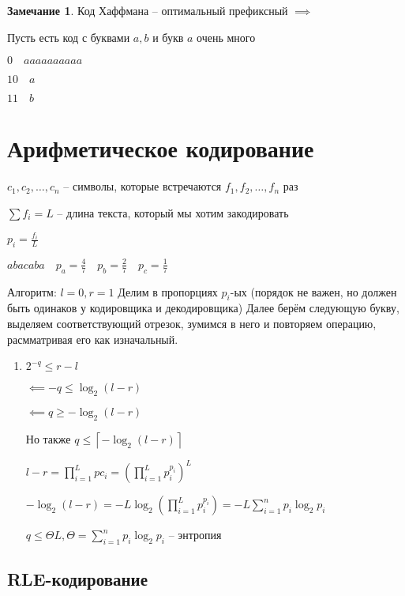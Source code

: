 \documentclass{book}
\theoremstyle{definition}
\newtheorem*{note}{Замечание}
\begin{document}
\begin{note}
    Код Хаффмана -- оптимальный префиксный $\implies $
\end{note}

Пусть есть код с буквами $a, b$ и букв  $a$ очень много

 $0\quad aaaaaaaaaa$

  $10\quad a$ 

  $11\quad b$

  \section{Арифметическое кодирование}

  $c_1, c_2, \ldots, c_n$ -- символы, которые встречаются $f_1, f_2, \ldots, f_n$ раз

  $\sum f_i =L$ -- длина текста, который мы хотим закодировать

   $p_i = \frac{f_i}{L}$ 

   $abacaba\quad p_a = \frac{4}{7}\quad p_b = \frac{2}{7}\quad p_c = \frac{1}{7}$

   Алгоритм: $l=0, r=1$ Делим в пропорциях  $p_i$-ых (порядок не важен, но должен быть одинаков у кодировщика и декодировщика) Далее берём следующую букву, выделяем соответствующий отрезок, зумимся в него и повторяем операцию, расмматривая его как изначальный.

    \begin{enumerate}
        \item $2^{-q}\leqslant r-l$

            $\impliedby -q\leqslant \log _2 (l-r)$ 

            $\impliedby q\geqslant -\log _2(l-r)$
            
            Но также $q\leqslant \left\lceil -\log _2(l-r) \right\rceil $

            $l-r = \prod_{i=1}^L pc_i = \left( \prod_{i=1}^L p_i^{p_i} \right) ^L$

            $-\log _2(l-r) = -L\log _2\left( \prod_{i=1}^{L}p_i^{p_i}\right)  = -L \sum_{i=1}^{n} p_i\log _2p_i$

            $q\leqslant \Theta L, \Theta = \sum_{i=1}^{n} p_i\log _2p_i$ -- энтропия 

   \end{enumerate}

   \subsection{RLE-кодирование}
\end{document}
